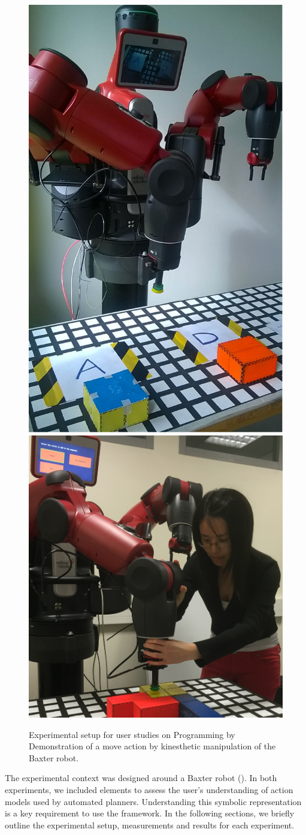 \begin{figure}[htp]
	\centering
	\includegraphics[width=.3\textwidth]{figures/experiment1}\hspace{1cm}%
	\includegraphics[width=.3\textwidth]{figures/experiment-setup2}
	
	\caption{Experimental setup for user studies on Programming by Demonstration of a move action by kinesthetic manipulation of the Baxter robot.}
	\label{fig:Baxter}
	
\end{figure}

The experimental context was designed around a Baxter robot ().
In both experiments, we included elements to assess the user's understanding of action models used by automated planners.
Understanding this symbolic representation is a key requirement to use the framework.
In the following sections, we briefly outline the experimental setup, measurements and results for each experiment.
 

